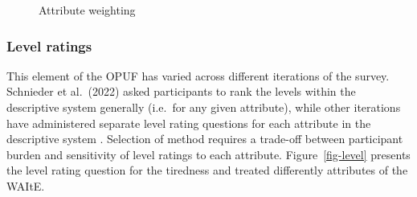 \documentclass[
  number,
  preprint]{elsarticle}
\begin{document}
\begin{figure}
\begin{minipage}{0.50\linewidth}
{}


\end{minipage}%

\caption{\label{fig-attribute}Attribute weighting}

\end{figure}%

\subsubsection{Level ratings}\label{level-ratings}

This element of the OPUF has varied across different iterations of the
survey. Schnieder et al.~(2022) \citep{Schneider2022TheStates} asked
participants to rank the levels within the descriptive system generally
(i.e.~for any given attribute), while other iterations have administered
separate level rating questions for each attribute in the descriptive
system \citep{Bray2024DevelopmentImpairment}. Selection of method
requires a trade-off between participant burden and sensitivity of level
ratings to each attribute. Figure~\ref{fig-level} presents the level
rating question for the tiredness and treated differently attributes of
the WAItE.
\end{document}
